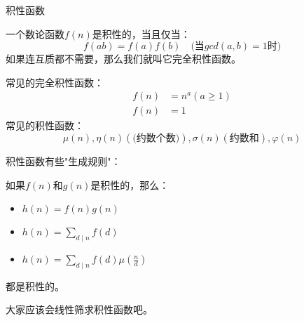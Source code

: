\documentclass[9pt]{beamer}
\begin{document}
			\begin{frame}{积性函数}
				\begin{definition}[积性函数]
					一个数论函数$f(n)$是积性的，当且仅当：
					$$
						f(ab) = f(a)f(b) \quad \text{(当$gcd(a,b) = 1$时)}
					$$
					如果连互质都不需要，那么我们就叫它完全积性函数。
				\end{definition}
				
							\pause
				常见的完全积性函数：
				\begin{align}
					f(n) & = n^a (a \geq 1)\\
					f(n) & = 1 
				\end{align}
							\pause
				常见的积性函数：
				$$
					\mu(n), \eta(n)(\text{(约数个数)}), \sigma(n)(\text{约数和}), \varphi(n)
				$$
			\end{frame}
			\begin{frame}
				积性函数有些"生成规则"：
				
				如果$f(n)$和$g(n)$是积性的，那么：
				\begin{itemize}
					\item $h(n) = f(n)g(n)$
					\item $h(n) = \sum_{d \mid n}f(d)$
					\item $h(n) = \sum_{d \mid n}f(d)\mu(\frac{n}{d})$
				\end{itemize}
				都是积性的。
				
				\pause
				
				大家应该会线性筛求积性函数吧。
				
			\end{frame}	
		
\end{document}
